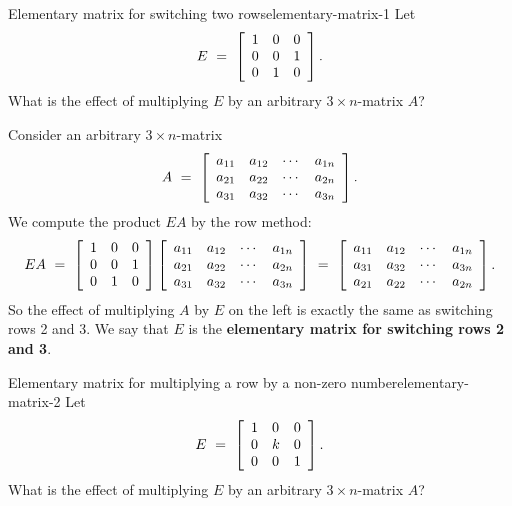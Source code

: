 \documentclass{ximera}
\begin{document}
\begin{example}{Elementary matrix for switching two rows}{elementary-matrix-1}
  Let
  \begin{equation*}
    E ~=~ \startmat{lll}
      1 & 0 & 0 \\
      0 & 0 & 1 \\
      0 & 1 & 0 \\
    \stopmat.
  \end{equation*}
  What is the effect of multiplying $E$ by an arbitrary $3\times
  n$-matrix $A$?
\end{example}

\begin{solution}
  Consider an arbitrary $3\times n$-matrix
  \begin{equation*}
    A ~=~ \startmat{cccc}
      a_{11} & a_{12} & \cdots & a_{1n} \\
      a_{21} & a_{22} & \cdots & a_{2n} \\
      a_{31} & a_{32} & \cdots & a_{3n} \\
    \stopmat.
  \end{equation*}
  We compute the product $EA$ by the row method:
  \begin{equation*}
    EA ~=~ \startmat{lll}
      1 & 0 & 0 \\
      0 & 0 & 1 \\
      0 & 1 & 0 \\
    \stopmat
    \startmat{cccc}
      a_{11} & a_{12} & \cdots & a_{1n} \\
      a_{21} & a_{22} & \cdots & a_{2n} \\
      a_{31} & a_{32} & \cdots & a_{3n} \\
    \stopmat
    ~=~
    \startmat{cccc}
      a_{11} & a_{12} & \cdots & a_{1n} \\
      a_{31} & a_{32} & \cdots & a_{3n} \\
      a_{21} & a_{22} & \cdots & a_{2n} \\
    \stopmat.
  \end{equation*}
  So the effect of multiplying $A$ by $E$ on the left is exactly the
  same as switching rows 2 and 3. We say that $E$ is the
  \textbf{elementary matrix for switching rows 2 and 3}.
\end{solution}

\begin{example}{Elementary matrix for multiplying a row by a non-zero number}{elementary-matrix-2}
  Let
  \begin{equation*}
    E ~=~ \startmat{lll}
      1 & 0 & 0 \\
      0 & k & 0 \\
      0 & 0 & 1 \\
    \stopmat.
  \end{equation*}
  What is the effect of multiplying $E$ by an arbitrary $3\times
  n$-matrix $A$?
\end{example}
\end{document}
